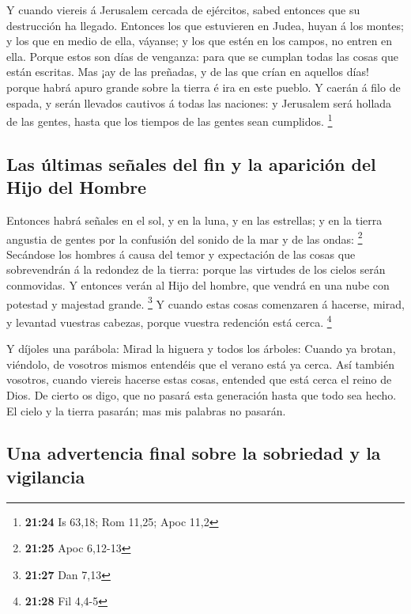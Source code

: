  Y cuando viereis á Jerusalem cercada de ejércitos, sabed
entonces que su destrucción ha llegado.  Entonces los que
estuvieren en Judea, huyan á los montes; y los que en medio de ella,
váyanse; y los que estén en los campos, no entren en ella. 
Porque estos son días de venganza: para que se cumplan todas las cosas
que están escritas.  Mas ¡ay de las preñadas, y de las que
crían en aquellos días! porque habrá apuro grande sobre la tierra é ira
en este pueblo.  Y caerán á filo de espada, y serán
llevados cautivos á todas las naciones: y Jerusalem será hollada de las
gentes, hasta que los tiempos de las gentes sean cumplidos. \footnote{\textbf{21:24}
  Is 63,18; Rom 11,25; Apoc 11,2}

\hypertarget{las-uxfaltimas-seuxf1ales-del-fin-y-la-apariciuxf3n-del-hijo-del-hombre}{%
\subsection{Las últimas señales del fin y la aparición del Hijo del
Hombre}\label{las-uxfaltimas-seuxf1ales-del-fin-y-la-apariciuxf3n-del-hijo-del-hombre}}

 Entonces habrá señales en el sol, y en la luna, y en las
estrellas; y en la tierra angustia de gentes por la confusión del sonido
de la mar y de las ondas: \footnote{\textbf{21:25} Apoc 6,12-13}
 Secándose los hombres á causa del temor y expectación de
las cosas que sobrevendrán á la redondez de la tierra: porque las
virtudes de los cielos serán conmovidas.  Y entonces verán
al Hijo del hombre, que vendrá en una nube con potestad y majestad
grande. \footnote{\textbf{21:27} Dan 7,13}  Y cuando estas
cosas comenzaren á hacerse, mirad, y levantad vuestras cabezas, porque
vuestra redención está cerca. \footnote{\textbf{21:28} Fil 4,4-5}

 Y díjoles una parábola: Mirad la higuera y todos los
árboles:  Cuando ya brotan, viéndolo, de vosotros mismos
entendéis que el verano está ya cerca.  Así también
vosotros, cuando viereis hacerse estas cosas, entended que está cerca el
reino de Dios.  De cierto os digo, que no pasará esta
generación hasta que todo sea hecho.  El cielo y la tierra
pasarán; mas mis palabras no pasarán.

\hypertarget{una-advertencia-final-sobre-la-sobriedad-y-la-vigilancia}{%
\subsection{Una advertencia final sobre la sobriedad y la
vigilancia}\label{una-advertencia-final-sobre-la-sobriedad-y-la-vigilancia}}

